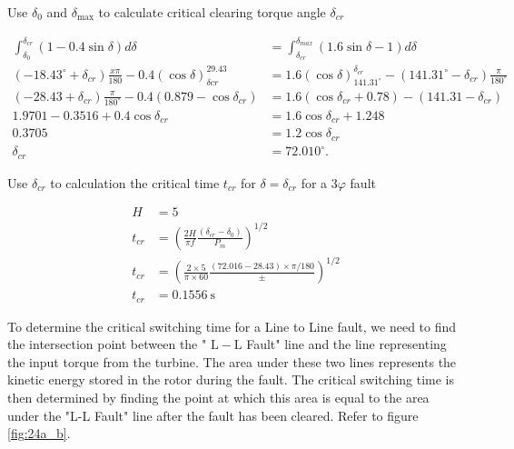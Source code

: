 \documentclass[main.tex]{subfiles}
\begin{document}
\begin{enumerate}
Use $\delta_0$ and $\delta_{\text{max}}$ to calculate critical clearing torque angle $\delta_{cr}$

$$
\begin{aligned}
\int_{\delta_0}^{\delta_{cr}}(1-0.4 \sin \delta) d\delta &= \int_{\delta_{cr}}^{\delta_{max}}(1.6 \sin \delta-1) d\delta \\
\left(-18.43^{\circ}+\delta_{c r}\right) \frac{x \pi}{180}-0.4(\cos \delta)_{\delta c r}^{29.43} &= 1.6(\cos \delta)_{141.31^{\circ}}^{\delta_{c r}}-\left(141.31^{\circ}-\delta_{c r}\right) \frac{\pi}{180^{\circ}} \\
\left(-28.43+\delta_{c r}\right) \frac{\pi}{180^{\circ}}-0.4\left(0.879-\cos \delta_{c r}\right) &= 1.6\left(\cos \delta_{c r}+0.78\right)-\left(141.31-\delta_{c r}\right) \\
1.9701-0.3516+0.4 \cos \delta_{c r} &= 1.6 \cos \delta_{c r}+1.248 \\
0.3705 &= 1.2 \cos \delta_{c r} \\
\delta_{c r} &= 72.010^{\circ}.
\end{aligned}
$$

Use $\delta_{cr}$ to calculation the critical time $t_{cr}$ for $\delta=\delta_{c r}$ for a $3\varphi$ fault

$$
\begin{aligned}
H &= 5\\
t_{cr} &= \left(\frac{2 H}{\pi f} \frac{\left(\delta_{cr}-\delta_0\right)}{P_m}\right)^{1 / 2} \\
t_{cr} &= \left(\frac{2 \times 5}{\pi \times 60} \frac{(72.016-28.43) \times \pi / 180}{ \pm}\right)^{1 / 2} \\
t_{cr} &= 0.1556 \mathrm{~s} 
\end{aligned}
$$

To determine the critical switching time for a Line to Line fault, we need to find the intersection point between the " $\mathrm{L}-\mathrm{L}$ Fault" line and the line representing the input torque from the turbine. The area under these two lines represents the kinetic energy stored in the rotor during the fault. The critical switching time is then determined by finding the point at which this area is equal to the area under the "L-L Fault" line after the fault has been cleared. Refer to figure \ref{fig:24a_b}.


\end{enumerate}
\end{document}
